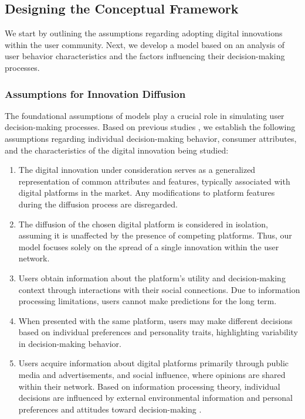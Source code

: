 \documentclass{article} %
\begin{document}
\subsection{Designing the Conceptual Framework}

We start by outlining the assumptions regarding adopting digital innovations within the user community. Next, we develop a model based on an analysis of user behavior characteristics and the factors influencing their decision-making processes. 

\subsubsection{Assumptions for Innovation Diffusion}

The foundational assumptions of models play a crucial role in simulating user decision-making processes. Based on previous studies \cite{bryson2007agent, joseph2020organizational}, we establish the following assumptions regarding individual decision-making behavior, consumer attributes, and the characteristics of the digital innovation being studied:

\begin{enumerate}
    \item The digital innovation under consideration serves as a generalized representation of common attributes and features,  typically associated with digital platforms in the market. Any modifications to platform features during the diffusion process are disregarded.
    \item The diffusion of the chosen digital platform is considered in isolation, assuming it is unaffected by the presence of competing platforms. Thus, our model focuses solely on the spread of a single innovation within the user network.
    \item Users obtain information about the platform’s utility and decision-making context through interactions with their social connections. Due to information processing limitations, users cannot make predictions for the long term.
    \item When presented with the same platform, users may make different decisions based on individual preferences and personality traits, highlighting variability in decision-making behavior. 
    \item Users acquire information about digital platforms primarily through public media and advertisements, and social influence, where opinions are shared within their network. Based on information processing theory, individual decisions are influenced by external environmental information and personal preferences and attitudes toward decision-making \cite{hann2007overcoming}.



 
\end{enumerate}
\end{document}
